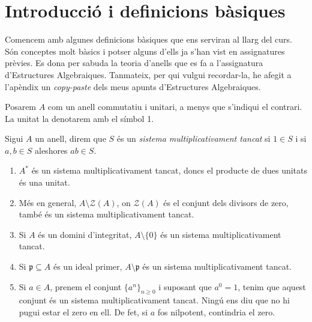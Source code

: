 \documentclass[../../../main.tex]{subfiles}
\begin{document}
\section{Introducció i definicions bàsiques}


Comencem amb algunes definicions bàsiques que ens serviran al llarg del curs. Són conceptes molt bàsics i potser alguns d'ells ja s'han vist en assignatures prèvies. Es dona per sabuda la teoria d'anells que es fa a l'assignatura d'Estructures Algebraiques. Tanmateix, per qui vulgui recordar-la, he afegit a l'apèndix un \textit{copy-paste} dels meus apunts d'Estructures Algebraiques.

Posarem $A$ com un anell commutatiu i unitari, a menys que s'indiqui el contrari. La unitat la denotarem amb el símbol 1. 

\begin{defi}
\label{def:sistemamultiplicativamenttancat} Sigui $A$ un anell, direm que $S$ és un \textit{sistema multiplicativament tancat} si $1\in S$ i si $a,b\in S$ aleshores $ab\in S$.
\end{defi}

\begin{ej}
\begin{enumerate}[(1)]
    \item $A^*$ és un sistema multiplicativament tancat, doncs el producte de dues unitats és una unitat.
    \item Més en general, $A\setminus\mathcal{Z}(A)$, on $\mathcal{Z}(A)$ és el conjunt dels divisors de zero, també és un sistema multiplicativament tancat.
    \item Si $A$ és un domini d'integritat, $A\setminus\{0\}$ és un sistema multiplicativament tancat.
    \item Si $\mathfrak{p}\subseteq A$ és un ideal primer, $A\setminus \mathfrak{p}$ és un sistema multiplicativament tancat.
    \item Si $a\in A$, prenem el conjunt $\{a^n\}_{n\geq 0}$ i suposant que $a^0 = 1$, tenim que aquest conjunt és un sistema multiplicativament tancat. Ningú ens diu que no hi pugui estar el zero en ell. De fet, si $a$ fos nilpotent, contindria el zero.
\end{enumerate}
\end{ej}
\end{document}
